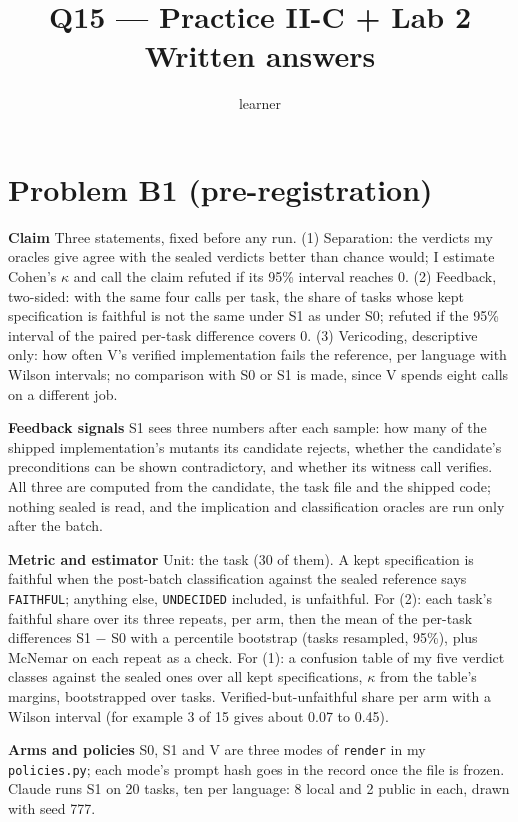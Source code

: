 \documentclass[11pt]{article}
\title{Q15 --- Practice II-C + Lab 2 \\ \large Written answers}
\author{learner}
\date{}
\begin{document}
\maketitle
\sloppy

\section*{Problem B1 (pre-registration)}\label{ans:B1}
\begin{answer}
\textbf{Claim} Three statements, fixed before any run. (1) Separation: the
verdicts my oracles give agree with the sealed verdicts better than chance
would; I estimate Cohen's $\kappa$ and call the claim refuted if its 95\%
interval reaches 0. (2) Feedback, two-sided: with the same four calls per task,
the share of tasks whose kept specification is faithful is not the same under
S1 as under S0; refuted if the 95\% interval of the paired per-task difference
covers 0. (3) Vericoding, descriptive only: how often V's verified
implementation fails the reference, per language with Wilson intervals; no
comparison with S0 or S1 is made, since V spends eight calls on a different
job.

\textbf{Feedback signals} S1 sees three numbers after each sample: how many of
the shipped implementation's mutants its candidate rejects, whether the
candidate's preconditions can be shown contradictory, and whether its witness
call verifies. All three are computed from the candidate, the task file and
the shipped code; nothing sealed is read, and the implication and
classification oracles are run only after the batch.

\textbf{Metric and estimator} Unit: the task (30 of them). A kept
specification is faithful when the post-batch classification against the
sealed reference says \texttt{FAITHFUL}; anything else, \texttt{UNDECIDED}
included, is unfaithful. For (2): each task's faithful share over its three
repeats, per arm, then the mean of the per-task differences S1 $-$ S0 with a
percentile bootstrap (tasks resampled, 95\%), plus McNemar on each repeat as a
check. For (1): a confusion table of my five verdict classes against the
sealed ones over all kept specifications, $\kappa$ from the table's margins,
bootstrapped over tasks. Verified-but-unfaithful share per arm with a Wilson
interval (for example 3 of 15 gives about 0.07 to 0.45).

\textbf{Arms and policies} S0, S1 and V are three modes of \texttt{render} in
my \texttt{policies.py}; each mode's prompt hash goes in the record once the
file is frozen. Claude runs S1 on 20 tasks, ten per language: 8 local and 2
public in each, drawn with seed 777.


\end{answer}
\end{document}
